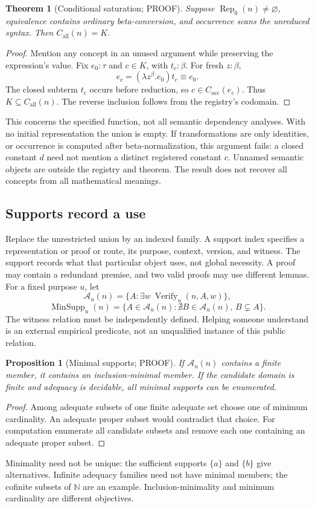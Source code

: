 \documentclass[11pt,a4paper]{article}
\newtheorem{theorem}[definition]{Theorem}
\newtheorem{proposition}[definition]{Proposition}
\theoremstyle{remark}
\newcommand{\Occ}{C_{\mathrm{occ}}}
\newcommand{\All}{C_{\mathrm{all}}}
\newcommand{\status}[1]{\textsf{\small #1}}
\begin{document}
\begin{theorem}[Conditional saturation; \status{PROOF}]\label{thm:saturation}
Suppose \(\operatorname{Rep}_0(n)\neq\varnothing\), equivalence contains
ordinary beta-conversion, and occurrence scans the unreduced syntax.
Then \(\All(n)=K\).
\end{theorem}
\begin{proof}
Mention any concept in an unused argument while preserving the expression's
value. Fix \(e_0:\tau\) and \(c\in K\), with \(t_c:\beta\).
For fresh \(z:\beta\),
\[
 e_c=(\lambda z^\beta.e_0)t_c \equiv e_0.
\]
The closed subterm \(t_c\) occurs before reduction, so \(c\in\Occ(e_c)\).
Thus \(K\subseteq\All(n)\). The reverse inclusion follows from the registry's
codomain.
\end{proof}
This concerns the specified function, not all semantic dependency analyses.
With no initial representation the union is empty. If transformations are
only identities, or occurrence is computed after beta-normalization, this
argument fails: a closed constant \(d\) need not mention a distinct registered
constant \(c\). Unnamed semantic objects are outside the registry and theorem.
The result does not recover all concepts from all mathematical meanings.

\subsection{Supports record a use}
Replace the unrestricted union by an indexed family. A support index specifies
a representation or proof or route, its purpose, context, version, and witness.
The support records what that particular object uses, not global necessity.
A proof may contain a redundant premise, and two valid proofs may use
different lemmas. For a fixed purpose \(u\), let
\[
 \mathcal A_u(n)=\{A:\exists w\ \operatorname{Verify}_u(n,A,w)\},
\]
\[
 \operatorname{MinSupp}_u(n)=
 \{A\in\mathcal A_u(n):\nexists B\in\mathcal A_u(n),\,B\subsetneq A\}.
\]
The witness relation must be independently defined. Helping someone understand
is an external empirical predicate, not an unqualified instance of this
public relation.

\begin{proposition}[Minimal supports; \status{PROOF}]
If \(\mathcal A_u(n)\) contains a finite member, it contains an
inclusion-minimal member. If the candidate domain is finite and adequacy is
decidable, all minimal supports can be enumerated.
\end{proposition}
\begin{proof}
Among adequate subsets of one finite adequate set choose one of minimum
cardinality. An adequate proper subset would contradict that choice.
For computation enumerate all candidate subsets and remove each
one containing an adequate proper subset.
\end{proof}
Minimality need not be unique: the sufficient supports \(\{a\}\) and \(\{b\}\)
give alternatives. Infinite adequacy families need not have minimal members;
the cofinite subsets of \(\mathbb N\) are an example.
Inclusion-minimality and minimum cardinality are different objectives.
\end{document}
